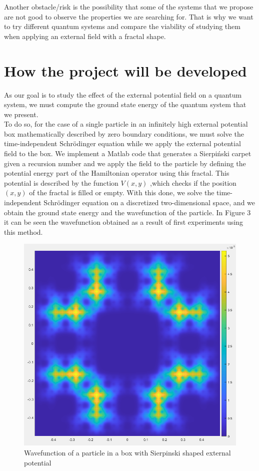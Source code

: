 \documentclass{article}
\begin{document}
Another obstacle/risk is the possibility that some of the systems that we propose are not good to observe the properties we are searching for. That is why we want to try different quantum systems and compare the viability of studying them when applying an external field with a fractal shape.

\section{How the project will be developed}
As our goal is to study the effect of the external potential field on a quantum system, we must compute the ground state energy of the quantum system that we present. \\

To do so, for the case of a single particle in an infinitely high external potential box mathematically described by zero boundary conditions, we must solve the time-independent Schrödinger equation while we apply the external potential field to the box. We implement a Matlab code that generates a Sierpiński carpet given a recursion number and we apply the field to the particle by defining the potential energy part of the Hamiltonian operator using this fractal. This potential is described by the function $V(x, y)$ ,which checks if the position $(x, y)$ of the fractal is filled or empty. With this done, we solve the time-independent Schrödinger equation on a discretized two-dimensional space, and we obtain the ground state energy and the wavefunction of the particle. In Figure 3 it can be seen the wavefunction obtained as a result of first experiments using this method.\\

\begin{figure}[h]
    \centering
    \includegraphics[scale=0.5]{./wavefunction.png}
    \caption{Wavefunction of a particle in a box with Sierpinski shaped external potential}
\end{figure}
\end{document}
